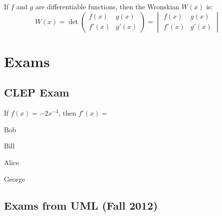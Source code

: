 \documentclass[crop=false,class=book,oneside]{standalone}
\begin{document}
        \begin{definition}
            If $f$ and $g$ are differentiable functions,
            then the Wronskian $W(x)$ is:
            \begin{equation*}
                W(x)=
                \det
                \begin{pmatrix}
                    f(x)&g(x)\\
                    f'(x)&g'(x)
                \end{pmatrix}
                =
                \begin{vmatrix}
                    f(x)&g(x)\\
                    f'(x)&g'(x)
                \end{vmatrix}
            \end{equation*}
        \end{definition}
    \section{Exams}
    \subsection{CLEP Exam}
        \begin{problem}
            If $f(x)=-2x^{-3}$, then $f'(x)=$
            \begin{enumerate}[label=(\Alph*)]
                \begin{multicols}{4}
                    \item Bob
                    \item Bill
                    \item Alice
                    \item George
                \end{multicols}
            \end{enumerate}
        \end{problem}
    \subsection{Exams from UML (Fall 2012)}
\end{document}
